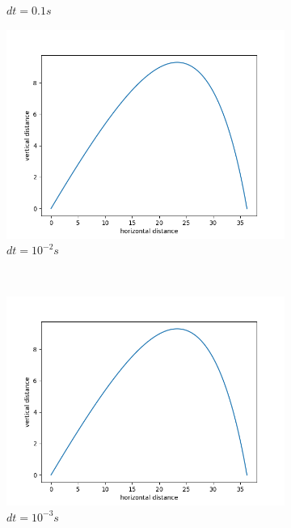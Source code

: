 \documentclass[12pt]{article}
\begin{document}
\begin{figure}[h]
\begin{subfigure}[h]{0.300\textwidth}
		\caption{$dt = 0.1s$}
	\end{subfigure}
		\begin{subfigure}[h]{0.30\textwidth}
		\centering
		\includegraphics[width=\textwidth]{dt10e-2.png}
		\caption{$dt = 10^{-2}s$ }
	\end{subfigure}\\ 
	\begin{subfigure}[h]{0.30\textwidth}
		\centering
		\includegraphics[width=\textwidth]{dt10e-3.png}
		\caption{$dt = 10^{-3}s$}
	\end{subfigure}
			\begin{subfigure}[h]{0.30\textwidth}
		\centering

\end{subfigure}
\end{figure}
\end{document}
